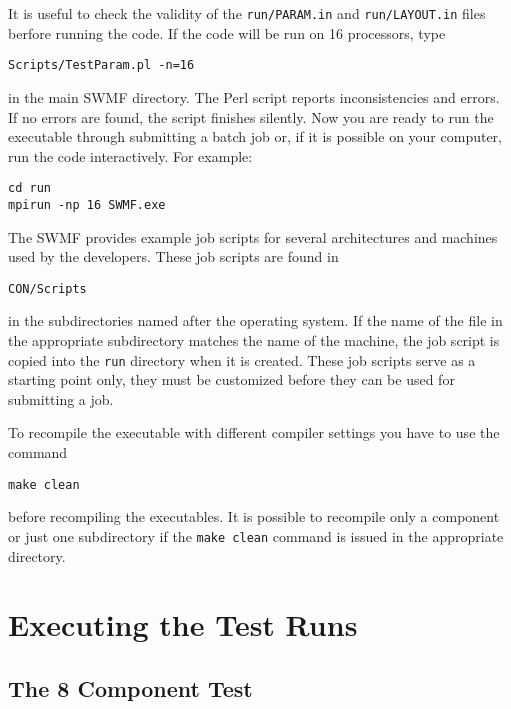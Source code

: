 It is useful to check the validity of the {\tt run/PARAM.in} and 
{\tt run/LAYOUT.in} files berfore running the code. If the
code will be run on 16 processors, type
\begin{verbatim}
Scripts/TestParam.pl -n=16
\end{verbatim}
in the main SWMF directory.
The Perl script reports inconsistencies and errors. 
If no errors are found, the script finishes silently.
Now you are ready to run the executable through submitting a batch job or, 
if it is possible on your computer, run the code interactively.  For example:
\begin{verbatim}
cd run
mpirun -np 16 SWMF.exe
\end{verbatim}
The SWMF provides example job scripts for several architectures and
machines used by the developers. These job scripts are found in 
\begin{verbatim}
CON/Scripts
\end{verbatim}
in the subdirectories named after the operating system. If the name
of the file in the appropriate subdirectory matches the 
name of the machine, the job script is copied into
the {\tt run} directory when it is created.
These job scripts serve as a starting point only, they must
be customized before they can be used for submitting a job.

To recompile the executable with different compiler settings you have
to use the command
\begin{verbatim}
make clean
\end{verbatim}
before recompiling the executables. It is possible to recompile
only a component or just one subdirectory if the {\tt make clean}
command is issued in the appropriate directory.

\section{Executing the Test Runs}

\subsection{The 8 Component Test}

